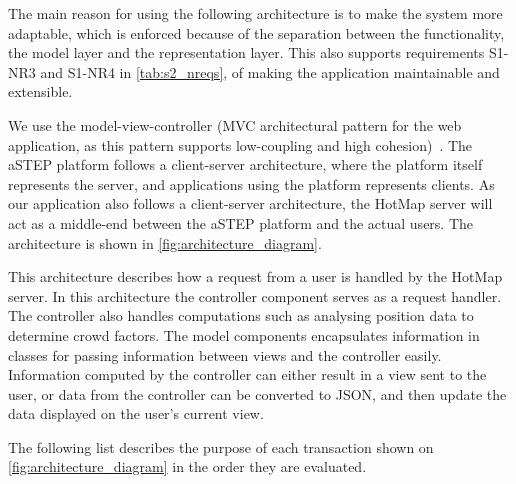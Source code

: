 The main reason for using the following architecture is to make the system more adaptable, which is enforced because of the separation between the functionality, the model layer and the representation layer. This also supports requirements S1-NR3 and S1-NR4 in \cref{tab:s2_nreqs}, of making the application maintainable and extensible.

We use the model-view-controller (MVC architectural pattern for the web application, as this pattern supports low-coupling and high cohesion)~\cite{website:MVC}. The aSTEP platform follows a client-server architecture, where the platform itself represents the server, and applications using the platform represents clients. As our application also follows a client-server architecture, the HotMap server will act as a middle-end between the aSTEP platform and the actual users. The architecture is shown in \cref{fig:architecture_diagram}.


This architecture describes how a request from a user is handled by the HotMap server. In this architecture the controller component serves as a request handler. The controller also handles computations such as analysing position data to determine crowd factors. The model components encapsulates information in classes for passing information between views and the controller easily. Information computed by the controller can either result in a view sent to the user, or data from the controller can be converted to JSON, and then update the data displayed on the user's current view. 



The following list describes the purpose of each transaction shown on \cref{fig:architecture_diagram} in the order they are evaluated.

